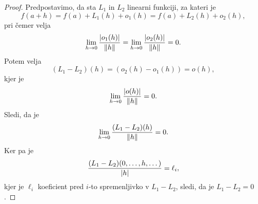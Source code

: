 \begin{proof}
Predpostavimo, da sta $L_1$ in $L_2$ linearni funkciji, za kateri je
\[
f(a+h)=f(a)+L_1(h)+o_1(h)=f(a)+L_2(h)+o_2(h),
\]
pri čemer velja
\[
\lim_{h\to 0}\frac{\left\lvert o_1(h)\right\rvert}{\left\lVert h\right\rVert}=\lim_{h\to 0}\frac{\left\lvert o_2(h)\right\rvert}{\left\lVert h\right\rVert}=0.
\]
Potem velja
\[
(L_1-L_2)(h)=(o_2(h)-o_1(h))=o(h),
\]
kjer je
\[
\lim_{h\to 0}\frac{\left\lvert o(h)\right\rvert}{\left\lVert h\right\rVert}=0.
\]
Sledi, da je
\[
\lim_{h\to 0}\frac{(L_1-L_2)(h)}{\left\lVert h\right\rVert}=0.
\]
Ker pa je
\[
\frac{(L_1-L_2)(0,\dots,h,\dots)}{\left\lvert h\right\rvert}=\ell_i,
\]
kjer je $\ell_i$ koeficient pred $i$-to spremenljivko v $L_1-L_2$, sledi, da je $L_1-L_2=0$.
\end{proof}